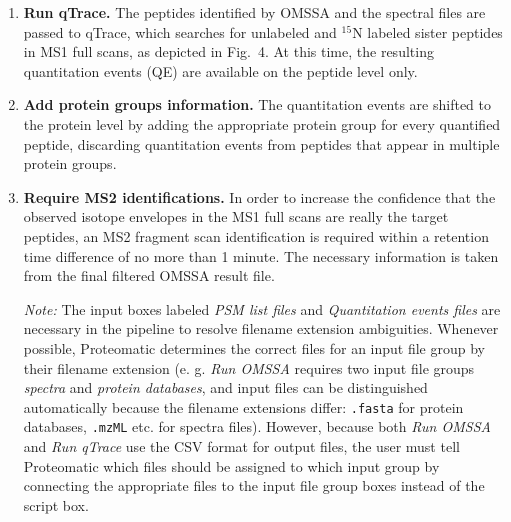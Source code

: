 \documentclass[11pt,letterpaper]{article}
\begin{document}
\begin{enumerate}
\item {\bf Run qTrace.}
The peptides identified by OMSSA and the spectral files are passed to qTrace,
which searches for unlabeled and $^{15}$N labeled sister peptides in MS1 full 
scans, as depicted in Fig.~4. At this time, the resulting 
quantitation events (QE) are available on the peptide level only.

\item {\bf Add protein groups information.}
The quantitation events are shifted to the protein level by adding the
appropriate protein group for every quantified peptide, discarding quantitation
events from peptides that appear in multiple protein groups.

\item {\bf Require MS2 identifications.}
In order to increase the confidence that the observed isotope envelopes in the 
MS1 full scans are really the target peptides, an MS2 fragment scan 
identification is required within a retention time difference of no more than 1 
minute. The necessary information is taken from the final filtered OMSSA 
result file. 

{\em Note:} The input boxes labeled {\em PSM list files} and {\em Quantitation 
events files} are necessary in the pipeline to resolve filename extension
ambiguities. Whenever possible, Proteomatic determines the correct files for 
an input file group by their filename extension (e. g. {\em Run OMSSA} requires
two input file groups {\em spectra} and {\em protein databases}, and input files
can be distinguished automatically because the filename extensions differ:
{\tt .fasta} for protein databases, {\tt .mzML} etc. for spectra files).
However, because both {\em Run OMSSA} and {\em Run qTrace} use the CSV format
for output files, the user must tell Proteomatic which files should be assigned 
to which input group by connecting the appropriate files to the input file 
group boxes instead of the script box.


\end{enumerate}
\end{document}
